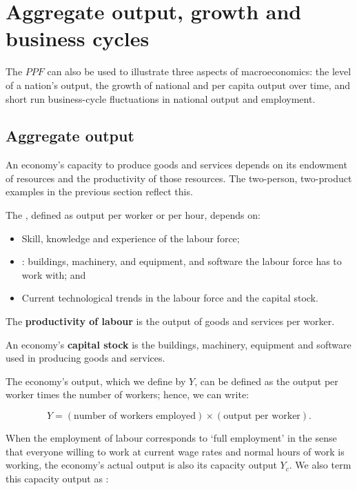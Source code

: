 \section{Aggregate output, growth and business cycles}\label{sec:ch1sec6}

The $PPF$ can also be used to illustrate three aspects of macroeconomics: the level of a nation's output, the growth of national and per capita output over time, and short run business-cycle fluctuations in national output and employment.

\subsection*{Aggregate output}

An economy's capacity to produce goods and services depends on its endowment of resources and the productivity of those resources. The two-person, two-product examples in the previous section reflect this.

The , defined as output per worker or per hour, depends on:

\begin{itemize}
\item  Skill, knowledge and experience of the labour force;
\item  {}: buildings, machinery, and equipment, and software the labour force has to work with; and
\item  Current technological trends in the labour force and the capital stock.
\end{itemize}

\begin{DefBox}
The \textbf{productivity of labour} is the output of goods and services per worker.

An economy's \textbf{capital stock} is the buildings, machinery, equipment and software used in producing goods and services.
\end{DefBox}

The economy's output, which we define by $Y$, can be defined as the output per worker times the number of workers; hence, we can write:

\begin{equation*}
Y=(\text{number of workers employed})\times(\text{output per worker}).
\end{equation*}

When the employment of labour corresponds to `full employment' in the sense that everyone willing to work at current wage rates and normal hours of work is working, the economy's actual output is also its capacity output $Y_c$. We also term this capacity output as :

